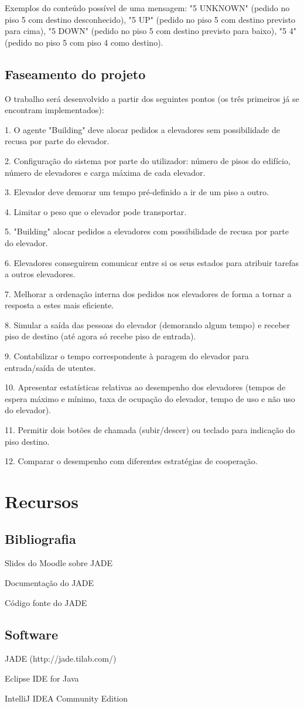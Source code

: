 \documentclass[a4paper]{article}
\begin{document}
Exemplos do conteúdo possível de uma mensagem: "5 UNKNOWN" (pedido no piso 5 com destino desconhecido), "5 UP" (pedido no piso 5 com destino previsto para cima), "5 DOWN" (pedido no piso 5 com destino previsto para baixo), "5 4" (pedido no piso 5 com piso 4 como destino).

\subsection{Faseamento do projeto} 

O trabalho será desenvolvido a partir dos seguintes pontos (os três primeiros já se encontram implementados):

1. O agente "Building" deve alocar pedidos a elevadores sem possibilidade de recusa por parte do elevador.

2. Configuração do sistema por parte do utilizador: número de pisos do edifício, número de elevadores e carga máxima de cada elevador.

3. Elevador deve demorar um tempo pré-definido a ir de um piso a outro.

4. Limitar o peso que o elevador pode transportar.

5. "Building" alocar pedidos a elevadores com possibilidade de recusa por parte do elevador.

6. Elevadores conseguirem comunicar entre si os seus estados para atribuir tarefas a outros elevadores.

7. Melhorar a ordenação interna dos pedidos nos elevadores de forma a tornar a resposta a estes mais eficiente.

8. Simular a saída das pessoas do elevador (demorando algum tempo) e receber piso de destino (até agora só recebe piso de entrada).

9. Contabilizar o tempo correspondente à paragem do elevador para entrada/saída de utentes.

10. Apresentar estatísticas relativas ao desempenho dos elevadores (tempos de espera máximo e mínimo, taxa de ocupação do elevador, tempo de uso e não uso do elevador).

11. Permitir dois botões de chamada (subir/descer) ou teclado para indicação do piso destino.

12. Comparar o desempenho com diferentes estratégias de cooperação.

\newpage

\section{Recursos}

\subsection{Bibliografia} 

Slides do Moodle sobre JADE

Documentação do JADE

Código fonte do JADE

\subsection{Software} 

JADE (http://jade.tilab.com/)

Eclipse IDE for Java

IntelliJ IDEA Community Edition
\end{document}
